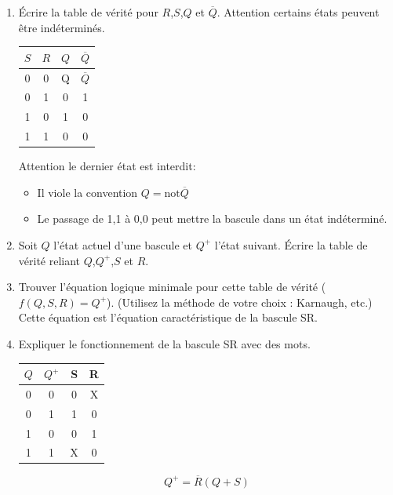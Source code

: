 \documentclass[a4paper,10pt]{exam}
\begin{document}
\begin{enumerate}
  \item Écrire la table de vérité pour $R$,$S$,$Q$ et $\overline{Q}$. Attention
    certains états peuvent être indéterminés.
\begin{solution}
\begin{tabular}{cc|cc}
  $S$&$R$&$Q$&$\overline{Q}$\\
  \hline
  0 & 0  & Q & $\overline{Q}$ \\
  0 & 1  & 0 & 1 \\
  1 & 0  & 1 & 0 \\
  1 & 1  & 0 & 0
\end{tabular}

Attention le dernier état est interdit:
\begin{itemize}
  \item Il viole la convention $Q = \textrm{not} \overline{Q}$
  \item Le passage de 1,1 à 0,0 peut mettre la bascule dans un état indéterminé.
\end{itemize}
\end{solution}


  \item Soit $Q$ l'état actuel d'une bascule et $Q^{+}$ l'état suivant. Écrire
    la table de vérité reliant $Q$,$Q^{+}$,$S$ et $R$.

  \item Trouver l'équation logique minimale pour cette table de vérité
    ($f(Q,S,R) = Q^{+}$). (Utilisez la méthode de votre choix : Karnaugh, etc.)
    Cette équation est l'équation caractéristique de la bascule SR.

  \item Expliquer le fonctionnement de la bascule SR avec des mots.

\begin{solution}
\begin{tabular}{cc|cc}
  $Q$&$Q^{+}$&S&R\\
  \hline
  0  & 0     &0&X\\
  0  & 1     &1&0\\
  1  & 0     &0&1\\
  1  & 1     &X&0
\end{tabular}
$$ Q^{+} = \overline{R} (Q + S) $$
\end{solution}
\end{enumerate}
\end{document}
